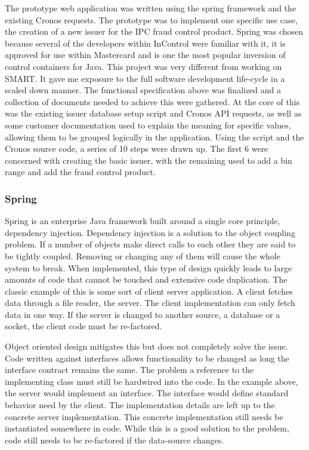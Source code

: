 \documentclass[a4paper, 11pt, titlepage]{article}
\begin{document}
The prototype web application was written using the spring framework and the existing Cronos requests. The prototype was to implement one specific use case, the creation of a new issuer for the IPC fraud control product.
Spring was chosen because several of the developers within InControl were familiar with it, it is approved for use within Mastercard and is one the most popular inversion of control containers for Java.
This project was very different from working on SMART. It gave me exposure to the full software development life-cycle in a scaled down manner. The functional specification above was finalized and a collection of documents needed to achieve this were gathered. At the core of this was the existing issuer database setup script and Cronos API requests, as well as some customer documentation used to explain the meaning for specific values, allowing them to be grouped logically in the application.
Using the script and the Cronos source code, a series of 10 steps were drawn up. The first 6 were concerned with creating the basic issuer, with the remaining used to add a bin range and add the fraud control product.

\subsubsection{Spring}

Spring is an enterprise Java framework built around a single core principle, dependency injection. Dependency injection is a solution to the object coupling problem. If a number of objects make direct calls to each other they are said to be tightly coupled. Removing or changing any of them will cause the whole system to break. When implemented, this type of design quickly leads to large amounts of code that cannot be touched and extensive code duplication. The classic example of this is some sort of client server application. A client fetches data through a file reader, the server. The client implementation can only fetch data in one way. If the server is changed to another source, a database or a socket, the client code must be re-factored. 

Object oriented design mitigates this but does not completely solve the issue. Code written against interfaces allows functionality to be changed as long the interface contract remains the same. The problem a reference to the implementing class must still be hardwired into the code. In the example above, the server would implement an interface. The interface would define standard behavior need by the client. The implementation details are left up to the concrete server implementation. This concrete implementation still needs be instantiated somewhere in code. While this is a good solution to the problem, code still needs to be re-factored if the data-source changes.
\end{document}
